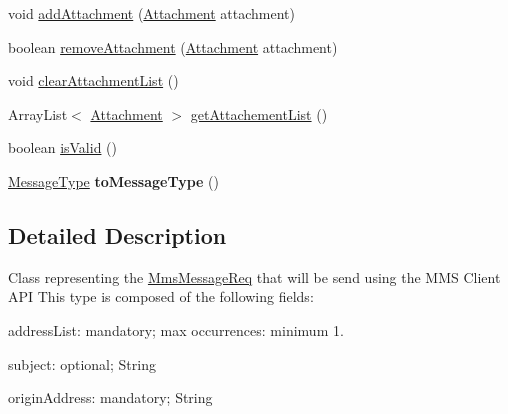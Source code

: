 \begin{DoxyCompactItemize}
\item 
void \hyperlink{classcom_1_1bluevia_1_1messagery_1_1mt_1_1mms_1_1data_1_1MmsMessageReq_ae28e647cbc178ae06885b65525af8fa9}{addAttachment} (\hyperlink{classcom_1_1bluevia_1_1messagery_1_1mt_1_1mms_1_1data_1_1Attachment}{Attachment} attachment)
\item 
boolean \hyperlink{classcom_1_1bluevia_1_1messagery_1_1mt_1_1mms_1_1data_1_1MmsMessageReq_af11cb07e309078bb96abd4fe69e8871d}{removeAttachment} (\hyperlink{classcom_1_1bluevia_1_1messagery_1_1mt_1_1mms_1_1data_1_1Attachment}{Attachment} attachment)
\item 
void \hyperlink{classcom_1_1bluevia_1_1messagery_1_1mt_1_1mms_1_1data_1_1MmsMessageReq_aa39093d86ae98d68d0bfc5a07387062c}{clearAttachmentList} ()
\item 
ArrayList$<$ \hyperlink{classcom_1_1bluevia_1_1messagery_1_1mt_1_1mms_1_1data_1_1Attachment}{Attachment} $>$ \hyperlink{classcom_1_1bluevia_1_1messagery_1_1mt_1_1mms_1_1data_1_1MmsMessageReq_a4d1202a532bd0db324d369821347b14b}{getAttachementList} ()
\item 
boolean \hyperlink{classcom_1_1bluevia_1_1messagery_1_1mt_1_1mms_1_1data_1_1MmsMessageReq_af0a26f8cfca4b73120dd968c35d96fb9}{isValid} ()
\item 
\hypertarget{classcom_1_1bluevia_1_1messagery_1_1mt_1_1mms_1_1data_1_1MmsMessageReq_a8589ea7a6814168c9529557dde9073b4}{
\hyperlink{classcom_1_1telefonica_1_1schemas_1_1unica_1_1rest_1_1mms_1_1v1_1_1MessageType}{MessageType} {\bfseries toMessageType} ()}
\label{classcom_1_1bluevia_1_1messagery_1_1mt_1_1mms_1_1data_1_1MmsMessageReq_a8589ea7a6814168c9529557dde9073b4}

\end{DoxyCompactItemize}


\subsection{Detailed Description}
Class representing the \hyperlink{classcom_1_1bluevia_1_1messagery_1_1mt_1_1mms_1_1data_1_1MmsMessageReq}{MmsMessageReq} that will be send using the MMS Client API This type is composed of the following fields: 
\begin{DoxyItemize}
\item addressList: mandatory; max occurrences: minimum 1. 
\item subject: optional; String 
\item originAddress: mandatory; String 
\end{DoxyItemize}

